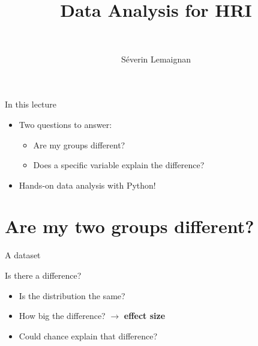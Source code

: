\documentclass[compress]{beamer}
\title{Data Analysis for HRI}
\subtitle{~}
\date{}
\author{Séverin Lemaignan}
\institute{{\bf Bristol Robotics Lab}\\University of the West of England}
\makeatletter
\let\beamer@writeslidentry@miniframeson=\beamer@writeslidentry
\def\beamer@writeslidentry@miniframesoff{%
  \expandafter\beamer@ifempty\expandafter{\beamer@framestartpage}{}%
  {%
    \clearpage\beamer@notesactions%
  }
}
\newcommand*{\miniframeson}{\let\beamer@writeslidentry=\beamer@writeslidentry@miniframeson}
\newcommand*{\miniframesoff}{\let\beamer@writeslidentry=\beamer@writeslidentry@miniframesoff}
\makeatother
\begin{document}
\miniframesoff


\maketitle

\miniframeson


\begin{frame}{In this lecture}

\begin{itemize}
    \item<+-> Two questions to answer:
        \begin{itemize}
            \item<+-> Are my groups different?
            \item<+-> Does a specific variable explain the difference?
        \end{itemize}
    \item<+-> Hands-on data analysis with Python!
\end{itemize}

\end{frame}




\section{Are my two groups different?}

\begin{frame}{A dataset}

    \centering

\end{frame}


\begin{frame}{}

    Is there a difference?

    \begin{itemize}
        \item Is the distribution the same?
        \item How big the difference? $\rightarrow$ \textbf{effect size}
        \item Could chance explain that difference?
    \end{itemize}
\end{frame}
\end{document}
